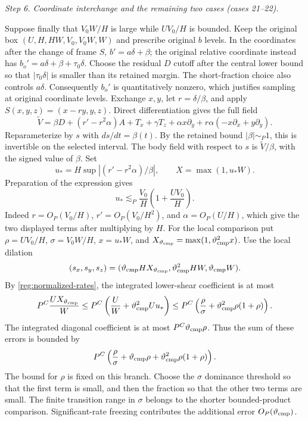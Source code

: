 \documentclass[11pt]{amsart}
\theoremstyle{definition}
\theoremstyle{remark}
\numberwithin{equation}{section}
\begin{document}
\par\medskip\noindent\textit{Step 6. Coordinate interchange and the remaining two cases (cases 21--22).}\par\nobreak\smallskip

Suppose finally that $V_0W/H$ is large while $UV_0/H$ is bounded. Keep the original box $(U,H,HW,V_0,V_0W,W)$ and prescribe original $b$ levels. In the coordinates after the change of frame $S$, $b'=a\delta+\beta$; the original relative coordinate instead has $b_o'=a\delta+\beta+\tau_0\delta$. Choose the residual $D$ cutoff after the central lower bound so that $|\tau_0\delta|$ is smaller than its retained margin. The short-fraction choice also controls $a\delta$. Consequently $b_o'$ is quantitatively nonzero, which justifies sampling at original coordinate levels. Exchange $x,y$, let $r=\delta/\beta$, and apply $S(x,y,z)=(x-r y,y,z)$. Direct differentiation gives the full field
\begin{equation}\label{reg:swapped-field}
\widetilde V=\beta D+(r'-r^2\alpha)A+T_x+\gamma T_z+\alpha x\partial_y+r\alpha(-x\partial_x+y\partial_y).
\end{equation}
Reparameterize by $s$ with $ds/dt=\beta(t)$. By the retained bound $|\beta|\sim_P1$, this is invertible on the selected interval. The body field with respect to $s$ is $\widetilde V/\beta$, with the signed value of $\beta$. Set
\[
u_*=H\sup|(r'-r^2\alpha)/\beta|,\qquad X=\max(1,u_*W).
\]
Preparation of the expression gives
\[
u_*\lesssim_P\frac{V_0}{H}\left(1+\frac{UV_0}{H}\right).
\]
Indeed $r=O_P(V_0/H)$, $r'=O_P(V_0/H^2)$, and $\alpha=O_P(U/H)$, which give the two displayed terms after multiplying by $H$. For the local comparison put $\rho=UV_0/H$, $\sigma=V_0W/H$, $x=u_*W$, and $X_{\vartheta_{\rm cmp}}=\max(1,\vartheta_{\rm cmp}^2x)$. Use the local dilation
\[
(s_x,s_y,s_z)=(\vartheta_{\rm cmp} H X_{\vartheta_{\rm cmp}},\vartheta_{\rm cmp}^2HW,\vartheta_{\rm cmp} W).
\]
By \eqref{reg:normalized-rates}, the integrated lower-shear coefficient is at most
\[
P^C\frac{UX_{\vartheta_{\rm cmp}}}{W}\le P^C\left(\frac{U}{W}+\vartheta_{\rm cmp}^2Uu_*\right)\le P^C\left(\frac\rho\sigma+\vartheta_{\rm cmp}^2\rho(1+\rho)\right).
\]
The integrated diagonal coefficient is at most $P^C\vartheta_{\rm cmp}\rho$. Thus the sum of these errors is bounded by
\begin{equation}\label{reg:swapped-error}
P^C\left(\frac\rho\sigma+\vartheta_{\rm cmp}\rho+\vartheta_{\rm cmp}^2\rho(1+\rho)\right).
\end{equation}
The bound for $\rho$ is fixed on this branch. Choose the $\sigma$ dominance threshold so that the first term is small, and then the fraction so that the other two terms are small. The finite transition range in $\sigma$ belongs to the shorter bounded-product comparison. Significant-rate freezing contributes the additional error $O_P(\vartheta_{\rm cmp})$.
\end{document}
